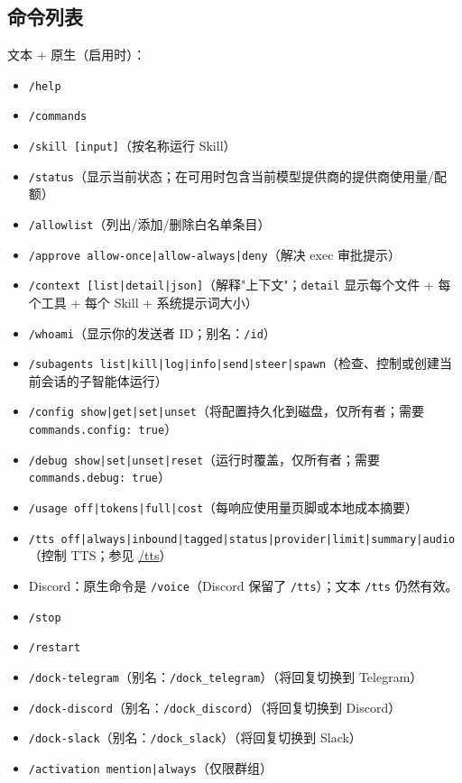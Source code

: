 \subsection{命令列表}


文本 + 原生（启用时）：

\begin{itemize}
  \item \texttt{/help}
  \item \texttt{/commands}
  \item \texttt{/skill  [input]}（按名称运行 Skill）
  \item \texttt{/status}（显示当前状态；在可用时包含当前模型提供商的提供商使用量/配额）
  \item \texttt{/allowlist}（列出/添加/删除白名单条目）
  \item \texttt{/approve  allow-once|allow-always|deny}（解决 exec 审批提示）
  \item \texttt{/context [list|detail|json]}（解释"上下文"；\texttt{detail} 显示每个文件 + 每个工具 + 每个 Skill + 系统提示词大小）
  \item \texttt{/whoami}（显示你的发送者 ID；别名：\texttt{/id}）
  \item \texttt{/subagents list|kill|log|info|send|steer|spawn}（检查、控制或创建当前会话的子智能体运行）
  \item \texttt{/config show|get|set|unset}（将配置持久化到磁盘，仅所有者；需要 \texttt{commands.config: true}）
  \item \texttt{/debug show|set|unset|reset}（运行时覆盖，仅所有者；需要 \texttt{commands.debug: true}）
  \item \texttt{/usage off|tokens|full|cost}（每响应使用量页脚或本地成本摘要）
  \item \texttt{/tts off|always|inbound|tagged|status|provider|limit|summary|audio}（控制 TTS；参见 \href{/tts}{/tts}）
  \item Discord：原生命令是 \texttt{/voice}（Discord 保留了 \texttt{/tts}）；文本 \texttt{/tts} 仍然有效。
  \item \texttt{/stop}
  \item \texttt{/restart}
  \item \texttt{/dock-telegram}（别名：\texttt{/dock\_telegram}）（将回复切换到 Telegram）
  \item \texttt{/dock-discord}（别名：\texttt{/dock\_discord}）（将回复切换到 Discord）
  \item \texttt{/dock-slack}（别名：\texttt{/dock\_slack}）（将回复切换到 Slack）
  \item \texttt{/activation mention|always}（仅限群组）

\end{itemize}
